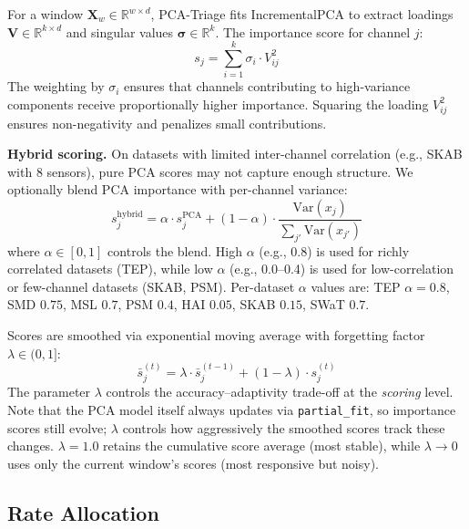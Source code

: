 \documentclass[journal]{IEEEtran}
\begin{document}
For a window $\mathbf{X}_w \in \mathbb{R}^{w \times d}$, PCA-Triage fits IncrementalPCA to extract loadings $\mathbf{V} \in \mathbb{R}^{k \times d}$ and singular values $\boldsymbol{\sigma} \in \mathbb{R}^k$. The importance score for channel $j$:
\begin{equation}
s_j = \sum_{i=1}^{k} \sigma_i \cdot V_{ij}^2
\label{eq:importance}
\end{equation}
The weighting by $\sigma_i$ ensures that channels contributing to high-variance components receive proportionally higher importance. Squaring the loading $V_{ij}^2$ ensures non-negativity and penalizes small contributions.

\textbf{Hybrid scoring.} On datasets with limited inter-channel correlation (e.g., SKAB with 8 sensors), pure PCA scores may not capture enough structure. We optionally blend PCA importance with per-channel variance:
\begin{equation}
s_j^{\text{hybrid}} = \alpha \cdot s_j^{\text{PCA}} + (1 - \alpha) \cdot \frac{\text{Var}(x_j)}{\sum_{j'} \text{Var}(x_{j'})}
\label{eq:hybrid}
\end{equation}
where $\alpha \in [0, 1]$ controls the blend. High $\alpha$ (e.g., 0.8) is used for richly correlated datasets (TEP), while low $\alpha$ (e.g., 0.0--0.4) is used for low-correlation or few-channel datasets (SKAB, PSM). Per-dataset $\alpha$ values are: TEP $\alpha{=}0.8$, SMD $0.75$, MSL $0.7$, PSM $0.4$, HAI $0.05$, SKAB $0.15$, SWaT $0.7$.

Scores are smoothed via exponential moving average with forgetting factor $\lambda \in (0, 1]$:
\begin{equation}
\bar{s}_j^{(t)} = \lambda \cdot \bar{s}_j^{(t-1)} + (1 - \lambda) \cdot s_j^{(t)}
\label{eq:smoothing}
\end{equation}
The parameter $\lambda$ controls the accuracy--adaptivity trade-off at the \textit{scoring} level. Note that the PCA model itself always updates via \texttt{partial\_fit}, so importance scores still evolve; $\lambda$ controls how aggressively the smoothed scores track these changes. $\lambda = 1.0$ retains the cumulative score average (most stable), while $\lambda \to 0$ uses only the current window's scores (most responsive but noisy).

\subsection{Rate Allocation}
\end{document}
